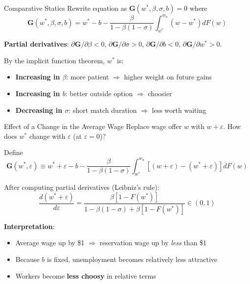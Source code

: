 \documentclass[blue]{beamer}
\begin{document}
	\begin{frame}{Comparative Statics}
		Rewrite equation as $\mathbf{G}(w^*, \beta, \sigma, b) = 0$ where
		\[
		\mathbf{G}(w^*, \beta, \sigma, b) = w^* - b - \frac{\beta}{1 - \beta(1 - \sigma)} \int_{w^*}^{w_u} (w - w^*) dF(w)
		\]
		
		\bigskip
		\textbf{Partial derivatives}: $\partial \mathbf{G} / \partial \beta < 0$, $\partial \mathbf{G} / \partial \sigma > 0$, $\partial \mathbf{G} / \partial b < 0$, $\partial \mathbf{G} / \partial w^* > 0$.
		
		\bigskip
		By the implicit function theorem, $w^*$ is:
		\begin{itemize}
			\item \textbf{Increasing in $\beta$}: more patient $\Rightarrow$ higher weight on future gains
			\item \textbf{Increasing in $b$}: better outside option $\Rightarrow$ choosier
			\item \textbf{Decreasing in $\sigma$}: short match duration $\Rightarrow$ less worth waiting
		\end{itemize}
	\end{frame}
	
	
	\begin{frame}{Effect of a Change in the Average Wage}
		Replace wage offer $w$ with $w + \varepsilon$. How does $w^*$ change with $\varepsilon$ (at $\varepsilon = 0$)?
		
		Define 
		$$\mathbf{G}(w^*, \varepsilon) \equiv w^* + \varepsilon - b - \frac{\beta}{1 - \beta(1 - \sigma)} \int_{w^*}^{w_u} [(w + \varepsilon) - (w^* + \varepsilon)] dF(w)
		$$
		
		After computing partial derivatives (Leibniz's rule):
		\[
		\frac{d(w^* + \varepsilon)}{d\varepsilon} = \frac{\beta [1 - F(w^*)]}{1 - \beta(1 - \sigma) + \beta [1 - F(w^*)]} \in (0, 1)
		\]
		
		\bigskip
		\textbf{Interpretation}:
		\begin{itemize}
			\item Average wage up by \$1 $\Rightarrow$ reservation wage up by \emph{less} than \$1
			\item Because $b$ is fixed, unemployment becomes relatively less attractive
			\item Workers become \textbf{less choosy} in relative terms
		\end{itemize}
	\end{frame}
	
\end{document}
